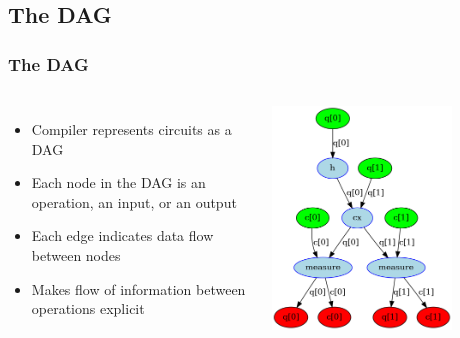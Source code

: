 \documentclass[aspectratio=169,11pt,hyperref={colorlinks=true}]{beamer}
\begin{document}
\subsection{The DAG}
\begin{frame}
    \frametitle{The DAG}
        \begin{columns}
                \begin{itemize}
                    \item Compiler represents circuits as a DAG
                    \item Each node in the DAG is an operation, an input, or
                          an output
                    \item Each edge indicates data flow between nodes
                    \item Makes flow of information between operations
                        explicit
                \end{itemize}
                \centering
                \includegraphics[width=0.75\textwidth]{bell-dag.png}
        \end{columns}
\end{frame}
\end{document}
